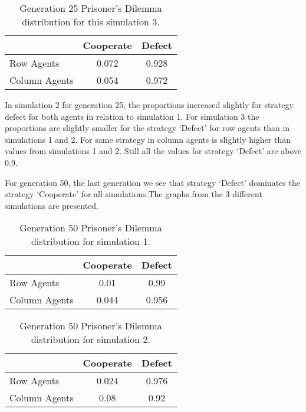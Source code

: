 \begin{table}[H]
\begin{center}
\begin{tabular}{|l|c|c|}
\hline
& Cooperate & Defect \\ 
\hline
Row Agents & 0.072 & 0.928\\
\hline
Column Agents & 0.054 & 0.972\\
\hline
\end{tabular}
\end{center}
\caption{Generation 25 Prisoner’s Dilemma distribution for this simulation 3.}
\label{tab:pds3g25}
\end{table}


In simulation 2 for generation 25, the proportions increased slightly for strategy defect for both agents in relation to simulation 1. For simulation 3 the proportions are slightly smaller for the strategy `Defect' for row agents than in simulations 1 and 2. For same strategy in column agents is slightly higher than values from simulations 1 and 2. Still all the values for strategy `Defect' are above 0.9.

For generation 50, the last generation we see that strategy `Defect' dominates the strategy `Cooperate' for all simulations.The graphs from the 3 different simulations are presented.

\begin{table}[H]
\begin{center}
\begin{tabular}{|l|c|c|}
\hline
& Cooperate & Defect \\ 
\hline
Row Agents & 0.01 & 0.99\\
\hline
Column Agents & 0.044 & 0.956\\
\hline
\end{tabular}
\end{center}
\caption{ Generation 50 Prisoner’s Dilemma distribution for simulation 1.}
\label{tab:pds1g50}
\end{table}

\begin{table}[H]
\begin{center}
\begin{tabular}{|l|c|c|}
\hline
& Cooperate & Defect \\ 
\hline
Row Agents & 0.024 & 0.976\\
\hline
Column Agents & 0.08 & 0.92\\
\hline
\end{tabular}
\end{center}
\caption{Generation 50 Prisoner’s Dilemma distribution for simulation 2.}
\label{tab:pds2g50}
 \end{table}

